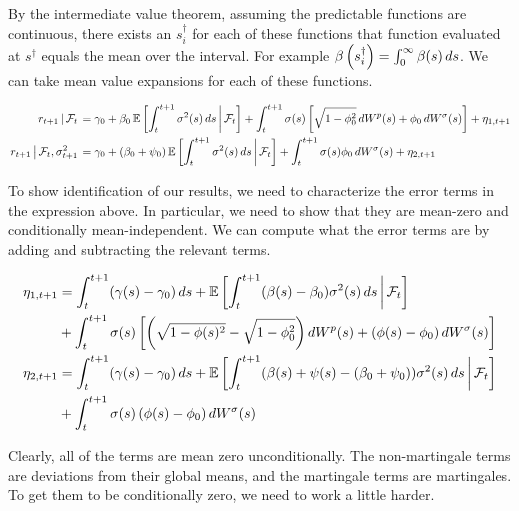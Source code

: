 \documentclass[11pt, letterpaper, twoside, final]{article}
\begin{document}
By the intermediate value theorem, assuming the predictable functions are continuous, there exists an
$s_i^{\dagger}$ for each of these functions that function evaluated at $s^{\dagger}$ equals the mean over the
interval.
For example $\beta\left(s_i^{\dagger}\right) = \int_0^{\infty} \beta(s) \mathop{}\!d s$.  
We can take mean value expansions for each of these functions.

\begin{alignat}{1}
    \label{eqn:price_decomp}
    \left. r_{t+1} \,\middle\vert\, \mathcal{F}_t \right. 
    &= \gamma_0 + \beta_0 \operatorname{\mathbb{E}}\left[\int_t^{t+1} \sigma^2(s) \mathop{}\!d s \,\middle\vert\, \mathcal{F}_t\right] + \int_t^{t+1} \sigma(s)
       \left[\sqrt{1 - \phi_0^2} \mathop{}\!d W^{p}(s) + \phi_0 \mathop{}\!d W^{\sigma}(s)\right] + \eta_{1,t+1} \\
    \left. r_{t+1} \,\middle\vert\, \mathcal{F}_t, \sigma^2_{t+1} \right. 
    &= \gamma_0 + (\beta_0 + \psi_0) \operatorname{\mathbb{E}}\left[\int_t^{t+1} \sigma^2(s) \mathop{}\!d s \,\middle\vert\, \mathcal{F}_t\right] + \int_t^{t+1}
       \sigma(s) \phi_0 \mathop{}\!d W^{\sigma}(s) + \eta_{2, t+1} 
\end{alignat}

To show identification of our results, we need to characterize the error terms in the expression above.
In particular, we need to show that they are mean-zero and conditionally mean-independent.
We can compute what the error terms are by adding and subtracting the relevant terms.

\begin{alignat}{1}
    \eta_{1,t+1} 
    &= \int_t^{t+1}(\gamma(s) - \gamma_0) \dif s + \E\left[\int_t^{t+1} (\beta(s) - \beta_0) \sigma^2(s) \dif s
        \mvert \F_t\right] \\
    &+ \int_t^{t+1} \sigma(s) \left[\left(\sqrt{1 - \phi(s)^2} - \sqrt{1 - \phi_0^2}\right) \dif W^{p}(s) +
        \left(\phi(s) - \phi_0\right) \dif W^{\sigma}(s)\right] \nonumber \\
%
    \eta_{2,t+1} 
    &= \int_t^{t+1}(\gamma(s) - \gamma_0) \dif s + \E\left[\int_t^{t+1} (\beta(s) + \psi(s) - (\beta_0 + \psi_0))
       \sigma^2(s) \dif s \mvert \F_t\right] \\
    &+ \int_t^{t+1} \sigma(s) \left(\phi(s) - \phi_0\right) \dif W^{\sigma}(s) \nonumber 
\end{alignat}

Clearly, all of the terms are mean zero unconditionally. 
The non-martingale terms are deviations from their global means, and the martingale terms are martingales.
To get them to be conditionally zero, we need to work a little harder.
\end{document}
